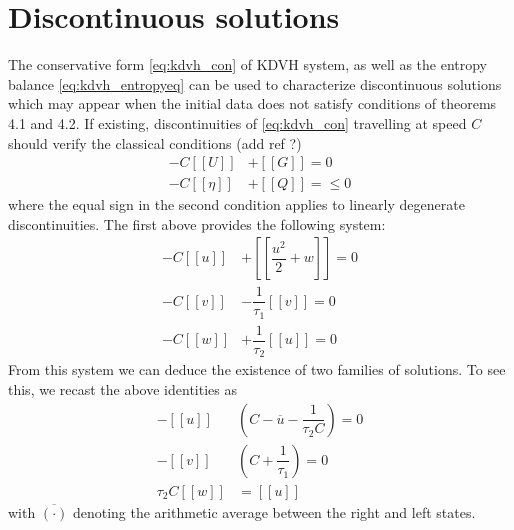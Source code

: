 \documentclass{article}
\theoremstyle{plain}
\theoremstyle{definition}
\numberwithin{theorem}{section}
\begin{document}
\section{Discontinuous solutions}


The conservative form \eqref{eq:kdvh_con} of KDVH system, as well as the entropy balance \eqref{eq:kdvh_entropyeq} can be used to characterize
discontinuous solutions which may appear when the initial data  does not satisfy conditions of theorems 4.1 and 4.2.  If existing,  discontinuities of \eqref{eq:kdvh_con}
travelling at  speed $C$  should verify the classical conditions  (add ref ?)
\begin{equation}\label{eq:shock-conditions}
\begin{aligned}
-C [\![ U]\!] & +  [\![ G]\!] =0 \\[5pt]
-C [\![ \eta]\!] & +  [\![ Q]\!] = \le 0
\end{aligned}
\end{equation}
where  the equal sign in the second condition applies to  linearly degenerate  discontinuities. The first above provides the following system:
\begin{equation} 
\begin{aligned}
-C [\![ u]\!] & +  [\![  \dfrac{u^2}{2} + w]\!] =0 \\[5pt]
-C [\![ v]\!] & -\dfrac{1}{\tau_1}  [\![   v]\!] =0 \\[5pt]
-C [\![ w]\!] & +\dfrac{1}{\tau_2}  [\![  u]\!] =0 
\end{aligned}
\end{equation}
From this system we can  deduce the existence of two families of solutions. To see this, we recast the above identities as  
\begin{equation}\label{eq:RH}
\begin{aligned}
-  [\![ u]\!]  &( C- { \overline u} -\dfrac{1}{\tau_2 C}    )=0   \\[5pt]
-  [\![ v]\!]  &( C+ \dfrac{1}{\tau_1}  )=0   \\[5pt]
\tau_2 C  [\![ w]\!] & =   [\![ u]\!]
\end{aligned}
\end{equation}
with $\overline{(\cdot)}$ denoting the arithmetic average between the right and left states.
\end{document}
